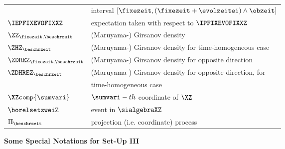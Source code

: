 \begin{longtable}{ll}
\\
\hspace{-0.33cm} $\ $ & interval $[\fixezeit,(\fixezeit + \evolzeitei) \wedge \obzeit]$ 
\\
\hspace{-0.33cm} $\IEPFIXEVOFIXXZ$ & expectation taken with respect to  $\IPFIXEVOFIXXZ$ 
\\
\hspace{-0.33cm} $\ZZ_{\fixezeit,\beschrzeit}$ & (Maruyama-) Girsanov density
\\
\hspace{-0.33cm} $\ZHZ_{\beschrzeit}$ & (Maruyama-) Girsanov density
for time-homogeneous case
\\
\hspace{-0.33cm} $\ZDREZ_{\fixezeit,\beschrzeit}$ & (Maruyama-) Girsanov density
for opposite direction
\\
\hspace{-0.33cm} $\ZDHREZ_{\beschrzeit}$ & (Maruyama-) Girsanov density
for opposite direction, for 
\\
\hspace{-0.33cm} $\ $ & time-homogeneous case
\\
\hspace{-0.33cm} $\XZcomp{\sumvari}$ & $\sumvari-th$ coordinate of $\XZ$
\\
\hspace{-0.33cm} $\borelsetzweiZ$ & event in $\sialgebraXZ$
\\
\hspace{-0.33cm} $\Pi_{\beschrzeit}$ & projection (i.e. coordinate)  process
\\
 
\end{longtable}









{\bf Some Special Notations for Set-Up III}


